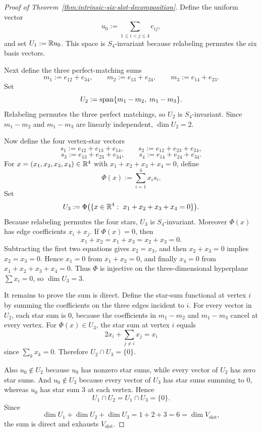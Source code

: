\begin{proof}[Proof of Theorem~\ref{thm:intrinsic-six-slot-decomposition}]
\label{proof:thm:intrinsic-six-slot-decomposition}
Define the uniform vector
\[
u_0:=\sum_{1\le i<j\le 4} e_{ij},
\]
and set $U_1:=\mathbb{R} u_0$. This space is $S_4$-invariant because relabeling
permutes the six basis vectors.

Next define the three perfect-matching sums
\[
m_1:=e_{12}+e_{34},\qquad
m_2:=e_{13}+e_{24},\qquad
m_3:=e_{14}+e_{23}.
\]
Set
\[
U_2:=\mathrm{span}\{m_1-m_2,\; m_1-m_3\}.
\]
Relabeling permutes the three perfect matchings, so $U_2$ is $S_4$-invariant.
Since $m_1-m_2$ and $m_1-m_3$ are linearly independent, $\dim U_2=2$.

Now define the four vertex-star vectors
\[
s_1:=e_{12}+e_{13}+e_{14},\qquad
s_2:=e_{12}+e_{23}+e_{24},
\]
\[
s_3:=e_{13}+e_{23}+e_{34},\qquad
s_4:=e_{14}+e_{24}+e_{34}.
\]
For $x=(x_1,x_2,x_3,x_4)\in\mathbb{R}^4$ with $x_1+x_2+x_3+x_4=0$, define
\[
\Phi(x):=\sum_{i=1}^4 x_i s_i.
\]
Set
\[
U_3:=\Phi\bigl(\{x\in\bbR^4:\ x_1+x_2+x_3+x_4=0\}\bigr).
\]
Because relabeling permutes the four stars, $U_3$ is $S_4$-invariant.
Moreover $\Phi(x)$ has edge coefficients $x_i+x_j$. If $\Phi(x)=0$, then
\[
x_1+x_2=x_1+x_3=x_2+x_3=0.
\]
Subtracting the first two equations gives $x_2=x_3$, and then
$x_2+x_3=0$ implies $x_2=x_3=0$. Hence $x_1=0$ from $x_1+x_2=0$, and finally
$x_4=0$ from $x_1+x_2+x_3+x_4=0$. Thus $\Phi$ is injective on the
three-dimensional hyperplane $\sum x_i=0$, so $\dim U_3=3$.

It remains to prove the sum is direct. Define the star-sum functional at
vertex $i$ by summing the coefficients on the three edges incident to $i$.
For every vector in $U_2$, each star sum is $0$, because the coefficients in
$m_1-m_2$ and $m_1-m_3$ cancel at every vertex. For $\Phi(x)\in U_3$, the star
sum at vertex $i$ equals
\[
2x_i+\sum_{j\ne i}x_j=x_i
\]
since $\sum_k x_k=0$. Therefore $U_2\cap U_3=\{0\}$.

Also $u_0\notin U_2$ because $u_0$ has nonzero star sums, while every vector of
$U_2$ has zero star sums. And $u_0\notin U_3$ because every vector of $U_3$
has star sums summing to $0$, whereas $u_0$ has star sum $3$ at each vertex.
Hence
\[
U_1\cap U_2=U_1\cap U_3=\{0\}.
\]
Since
\[
\dim U_1+\dim U_2+\dim U_3=1+2+3=6=\dim V_{\mathrm{slot}},
\]
the sum is direct and exhausts $V_{\mathrm{slot}}$.
\end{proof}

